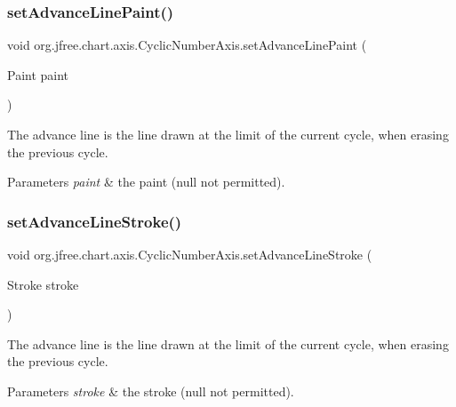 \subsubsection{\texorpdfstring{set\+Advance\+Line\+Paint()}{setAdvanceLinePaint()}}
{\footnotesize\ttfamily void org.\+jfree.\+chart.\+axis.\+Cyclic\+Number\+Axis.\+set\+Advance\+Line\+Paint (\begin{DoxyParamCaption}\item[{Paint}]{paint }\end{DoxyParamCaption})}

The advance line is the line drawn at the limit of the current cycle, when erasing the previous cycle.


\begin{DoxyParams}{Parameters}
{\em paint} & the paint ({\ttfamily null} not permitted). \\
\hline
\end{DoxyParams}
\mbox{\label{classorg_1_1jfree_1_1chart_1_1axis_1_1_cyclic_number_axis_af8d0b2abffc3bada56961fe0e5585aa1}} 
\subsubsection{\texorpdfstring{set\+Advance\+Line\+Stroke()}{setAdvanceLineStroke()}}
{\footnotesize\ttfamily void org.\+jfree.\+chart.\+axis.\+Cyclic\+Number\+Axis.\+set\+Advance\+Line\+Stroke (\begin{DoxyParamCaption}\item[{Stroke}]{stroke }\end{DoxyParamCaption})}

The advance line is the line drawn at the limit of the current cycle, when erasing the previous cycle.


\begin{DoxyParams}{Parameters}
{\em stroke} & the stroke ({\ttfamily null} not permitted). \\
\hline
\end{DoxyParams}
\mbox{\label{classorg_1_1jfree_1_1chart_1_1axis_1_1_cyclic_number_axis_a94a15f3f122f424a87536ab8248c141c}} 
